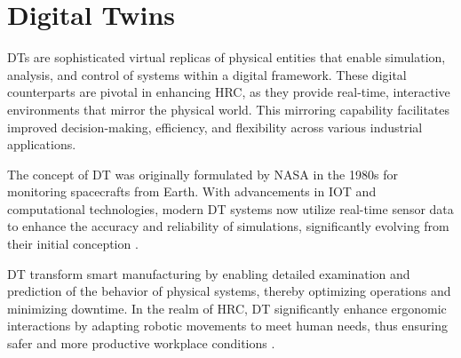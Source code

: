 



\section{Digital Twins}

\ac{DTs} are sophisticated virtual replicas of physical entities that enable simulation, analysis, and control of systems within a digital framework. 
These digital counterparts are pivotal in enhancing \ac{HRC}, as they provide real-time, interactive environments that mirror the physical world. 
This mirroring capability facilitates improved decision-making, efficiency, and flexibility across various industrial applications.

The concept of \ac{DT} was originally formulated by NASA in the 1980s for monitoring spacecrafts from Earth. With advancements in \ac{IOT} and 
computational technologies, modern \ac{DT} systems now utilize real-time sensor data to enhance the accuracy and reliability of simulations, 
significantly evolving from their initial conception \cite{liu2022digitaltwin}.

\ac{DT} transform smart manufacturing by enabling detailed examination and prediction of the behavior of physical systems, thereby optimizing operations 
and minimizing downtime. In the realm of \ac{HRC}, \ac{DT} significantly enhance ergonomic interactions by adapting robotic movements to meet human needs,
thus ensuring safer and more productive workplace conditions \cite{8477101}.

